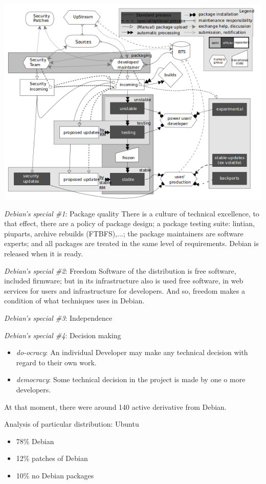 \documentclass[11pt]{article}
\begin{document}
\hfill\includegraphics[scale=0.6]{img/DebianDevelopmentProcess}\hspace*{\fill}
	
	\emph{Debian's special \#1}: Package quality
		There is a culture of technical excellence, to that effect, there are a policy of package design; a package testing suite: lintian, piuparts, archive rebuilds (FTBFS),...; the package maintainers are software experts; and all packages are treated in the same level of requirements.
	Debian is released when it is ready.

	\emph{Debian's special \#2}: Freedom
	Software of the distribution is free software, included firmware; but in its infrastructure also is used free software, in web services for users and infrastructure for developers. And so, freedom makes a condition of what techniques uses in Debian.

	\emph{Debian's special \#3}: Independence

	\emph{Debian's special \#4}: Decision making
	\begin{itemize}
			\item \emph{do-ocracy}: An individual Developer may make any technical decision with regard to their own work.
			\item \emph{democracy}: Some technical decision in the project is made by one o more developers.
	\end{itemize}

At that moment, there were around 140 active derivative from Debian.
		
Analysis of particular distribution: Ubuntu
\begin{itemize}
	\item 78\% Debian
	\item 12\% patches of Debian
	\item 10\% no Debian packages
\end{itemize}
	
\end{document}
